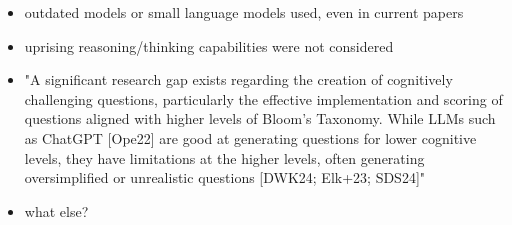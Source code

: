 
\begin{itemize}
    \item outdated models or small language models used, even in current papers
    \item uprising reasoning/thinking capabilities were not considered
    \item "A significant research gap exists regarding the creation of
cognitively challenging questions, particularly the effective implementation and scoring of questions
aligned with higher levels of Bloom's Taxonomy. While LLMs such as ChatGPT [Ope22] are good
at generating questions for lower cognitive levels, they have limitations at the higher levels, often
generating oversimplified or unrealistic questions [DWK24; Elk+23; SDS24]"
    \item what else?
\end{itemize}